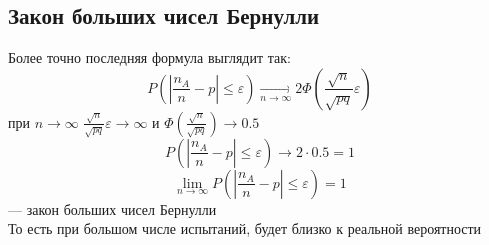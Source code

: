 \documentclass[english]{article}
\theoremstyle{plain}
\theoremstyle{remark}
\theoremstyle{definition}
\begin{document}
\subsection{Закон больших чисел Бернулли}
\label{sec:org84585ed}
Более точно последняя формула выглядит так:
\[ P\left(\left|\frac{n_A}{n} - p\right| \le \varepsilon\right) \xrightarrow[n \to \infty]{} 2\Phi\left(\frac{\sqrt{n}}{\sqrt{pq}}\varepsilon\right) \]
при \(n \to \infty\) \(\frac{\sqrt{n}}{\sqrt{pq}}\varepsilon \to \infty\) и \(\Phi\left(\frac{\sqrt{n}}{\sqrt{pq}}\right) \to 0.5\)
\[ P\left(\left|\frac{n_A}{n} - p\right| \le \varepsilon\right) \to 2\cdot0.5 = 1\]
\[ \lim_{n\to\infty}P\left(\left|\frac{n_A}{n} - p \right| \le \varepsilon \right) = 1 \]
--- закон больших чисел Бернулли \\
То есть при большом числе испытаний, будет близко к реальной вероятности
\end{document}
